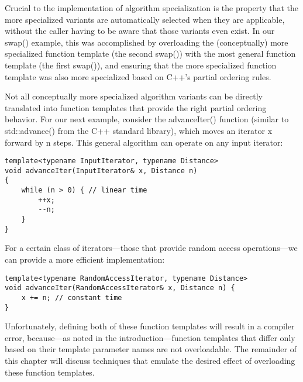 Crucial to the implementation of algorithm specialization is the property that the more specialized variants are automatically selected when they are applicable, without the caller having to be aware that those variants even exist. In our swap() example, this was accomplished by overloading the (conceptually) more specialized function template (the second swap()) with the most general function template (the first swap()), and ensuring that the more specialized function template was also more specialized based on C++’s partial ordering rules.

Not all conceptually more specialized algorithm variants can be directly translated into function templates that provide the right partial ordering behavior. For our next example, consider the advanceIter() function (similar to std::advance() from the C++ standard library), which moves an iterator x forward by n steps. This general algorithm can operate on any input iterator:

\begin{lstlisting}[style=styleCXX]
template<typename InputIterator, typename Distance>
void advanceIter(InputIterator& x, Distance n)
{
	while (n > 0) { // linear time
		++x;
		--n;
	}
}
\end{lstlisting}

For a certain class of iterators—those that provide random access operations—we can provide a more efficient implementation:

\begin{lstlisting}[style=styleCXX]
template<typename RandomAccessIterator, typename Distance>
void advanceIter(RandomAccessIterator& x, Distance n) {
	x += n; // constant time
}
\end{lstlisting}

Unfortunately, defining both of these function templates will result in a compiler error, because—as noted in the introduction—function templates that differ only based on their template parameter names are not overloadable. The remainder of this chapter will discuss techniques that emulate the desired effect of overloading these function templates.











